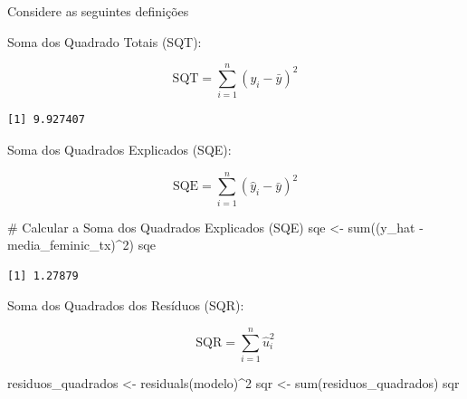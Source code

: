 \documentclass[
  letterpaper,
  DIV=11,
  numbers=noendperiod]{scrreprt}
\newenvironment{Shaded}{\begin{snugshade}}{\end{snugshade}}
\newcommand{\CommentTok}[1]{\textcolor[rgb]{0.37,0.37,0.37}{#1}}
\newcommand{\DecValTok}[1]{\textcolor[rgb]{0.68,0.00,0.00}{#1}}
\newcommand{\FunctionTok}[1]{\textcolor[rgb]{0.28,0.35,0.67}{#1}}
\newcommand{\NormalTok}[1]{\textcolor[rgb]{0.00,0.23,0.31}{#1}}
\newcommand{\OtherTok}[1]{\textcolor[rgb]{0.00,0.23,0.31}{#1}}
\newcommand{\SpecialCharTok}[1]{\textcolor[rgb]{0.37,0.37,0.37}{#1}}
\begin{document}
Considere as seguintes definições

Soma dos Quadrado Totais (SQT):

\[\text{SQT} = \sum_{i=1}^{n} (y_i - \bar{y})^2\]

\begin{Shaded}
\end{Shaded}

\begin{verbatim}
[1] 9.927407
\end{verbatim}

Soma dos Quadrados Explicados (SQE):

\[\text{SQE} = \sum_{i=1}^{n} (\hat{y}_i - \bar{y})^2\]

\begin{Shaded}
\begin{Highlighting}[]
\CommentTok{\# Calcular a Soma dos Quadrados Explicados (SQE)}
\NormalTok{sqe }\OtherTok{\textless{}{-}} \FunctionTok{sum}\NormalTok{((y\_hat }\SpecialCharTok{{-}}\NormalTok{ media\_feminic\_tx)}\SpecialCharTok{\^{}}\DecValTok{2}\NormalTok{)}
\NormalTok{sqe}
\end{Highlighting}
\end{Shaded}

\begin{verbatim}
[1] 1.27879
\end{verbatim}

Soma dos Quadrados dos Resíduos (SQR):

\[\text{SQR} = \sum_{i=1}^{n} \hat{u}_i^2\]

\begin{Shaded}
\begin{Highlighting}[]
\NormalTok{residuos\_quadrados }\OtherTok{\textless{}{-}} \FunctionTok{residuals}\NormalTok{(modelo)}\SpecialCharTok{\^{}}\DecValTok{2}
\NormalTok{sqr }\OtherTok{\textless{}{-}} \FunctionTok{sum}\NormalTok{(residuos\_quadrados)}
\NormalTok{sqr}
\end{Highlighting}
\end{Shaded}
\end{document}

